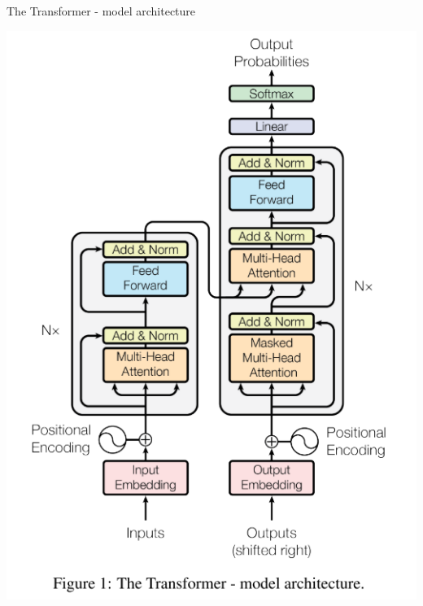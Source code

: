 \documentclass{beamer}
\begin{document}
\begin{frame}[fragile]{The Transformer - model architecture}
\begin{center}

	\includegraphics[width=\textwidth,height=\textheight,keepaspectratio]{mh_att.png}

\end{center}
\end{frame}
\end{document}

